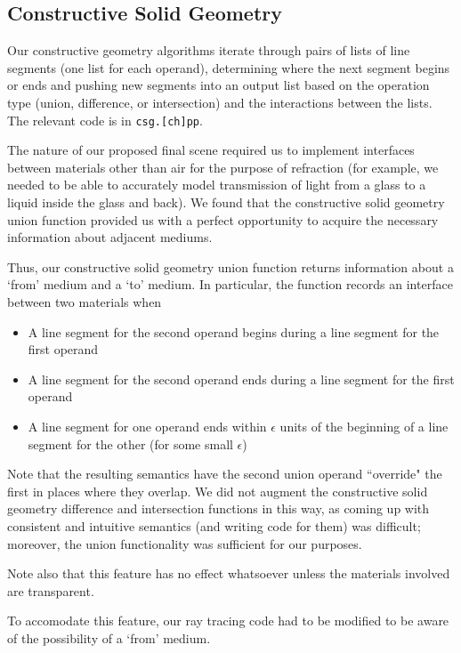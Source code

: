 \documentclass{article}
\begin{document}
\subsection{Constructive Solid Geometry}

Our constructive geometry algorithms iterate through pairs of lists
of line segments (one list for each operand), determining where the next segment
begins or ends and pushing new segments into an output list based on the
operation type (union, difference, or intersection) and the interactions between
the lists. The relevant code is in {\tt csg.[ch]pp}.

The nature of our proposed final scene required us to implement
interfaces between materials other than air for the purpose of refraction (for
example, we needed to be able to accurately model transmission of light from a
glass to a liquid inside the glass and back). We found that the constructive
solid geometry union function provided us with a perfect opportunity to acquire
the necessary information about adjacent mediums.

Thus, our constructive solid geometry union function returns information about a
`from' medium and a `to' medium. In particular, the function records an
interface between two materials when

\begin{itemize}
  \item A line segment for the second operand begins during a line segment for
    the first operand
  \item A line segment for the second operand ends during a line segment for the
    first operand
  \item A line segment for one operand ends within $\epsilon$ units of the
    beginning of a line segment for the other (for some small $\epsilon$)
\end{itemize}

Note that the resulting semantics have the second union operand ``override" the
first in places where they overlap. We did not augment the constructive solid
geometry difference and intersection functions in this way, as coming up with
consistent and intuitive semantics (and writing code for them) was
difficult; moreover, the union functionality was sufficient for our purposes.

Note also that this feature has no effect whatsoever unless the materials
involved are transparent.

To accomodate this feature, our ray tracing code had to be modified to be aware
of the possibility of a `from' medium.
\end{document}
